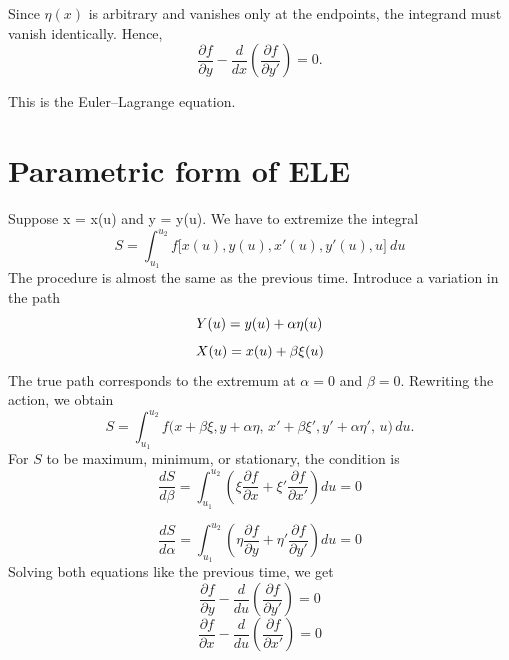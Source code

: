 \documentclass[12pt]{article}
\begin{document}
Since $\eta(x)$ is arbitrary and vanishes only at the endpoints, the integrand
must vanish identically. Hence,
\begin{equation}
\frac{\partial f}{\partial y}
-
\frac{d}{dx}
\left(
\frac{\partial f}{\partial y'}
\right)
= 0.
\end{equation}

This is the Euler--Lagrange equation.

\section{Parametric form of ELE}
Suppose x = x(u) and y = y(u). We have to extremize the integral 
\begin{equation}
    S = \int_{u_1}^{u_2}f\big[x(u),y(u),x'(u),y'(u),u\big]\ du
\end{equation}
The procedure is almost the same as the previous time. Introduce a variation in the path
\begin{equation}
    Y(u) = y(u) + \alpha \eta(u) \notag
\end{equation}
\begin{equation}
    X(u) = x(u) + \beta \xi(u) \notag
\end{equation}
The true path corresponds to the extremum at $\alpha = 0$ and $\beta = 0$. Rewriting the
action, we obtain
\begin{equation}
S = \int_{u_1}^{u_2} f\big(x + \beta \xi, y + \alpha \eta,\, x' + \beta \xi' , y' + \alpha \eta',\, u\big)\, du.
\end{equation}
For $S$ to be maximum, minimum, or stationary, the condition is
\begin{equation}
\frac{dS}{d\beta}
= \int_{u_1}^{u_2}
\left(
\xi \frac{\partial f}{\partial x}
+ \xi' \frac{\partial f}{\partial x'}
\right) du
= 0
\end{equation}

\begin{equation}
\frac{dS}{d\alpha}
= \int_{u_1}^{u_2}
\left(
\eta \frac{\partial f}{\partial y}
+ \eta' \frac{\partial f}{\partial y'}
\right) du
= 0
\end{equation}
Solving both equations like the previous time, we get
\begin{equation}
\frac{\partial f}{\partial y}
-
\frac{d}{du}
\left(
\frac{\partial f}{\partial y'}
\right)
= 0
\end{equation}
\begin{equation}
\frac{\partial f}{\partial x}
-
\frac{d}{du}
\left(
\frac{\partial f}{\partial x'}
\right)
= 0
\end{equation}
\end{document}
